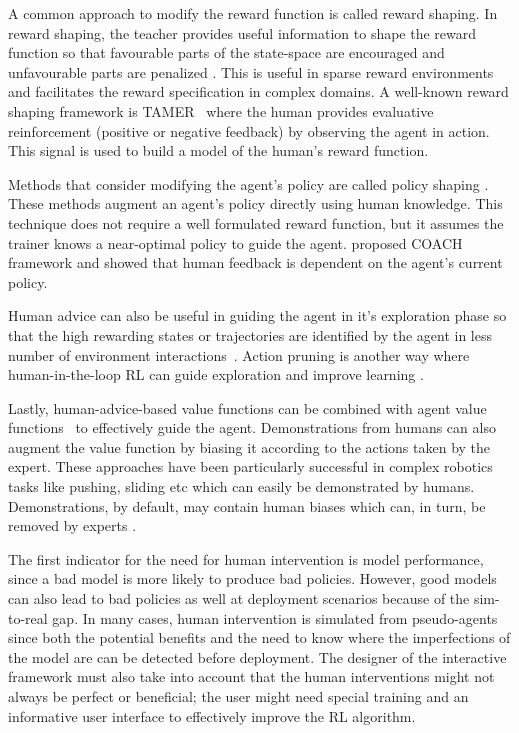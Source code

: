 \documentclass[twoside,11pt]{article}
\begin{document}
A common approach to modify the reward function is called reward shaping. In reward shaping, the teacher provides useful information to shape the reward function so that favourable parts of the state-space are encouraged and unfavourable parts are penalized \citep{ng:99}. This is useful in sparse reward environments and facilitates the reward specification in complex domains. A well-known reward shaping framework is TAMER~\citep{Knox:2008:TAMER, knox:13} where the human provides evaluative reinforcement (positive or negative feedback) by observing the agent in action. This signal is used to build a model of the human's reward function. 

Methods that consider modifying the agent's policy are called policy shaping \citep{cederborg2015policy,griffith2013policy,WuEtAl:2021:HITLDRLAutonomousDriving}. These methods augment an agent's policy directly using human knowledge. This technique does not require a well formulated reward function, but it assumes the trainer knows a near-optimal policy to guide the agent. \citet{macglashan2017interactive} proposed COACH framework and showed that human feedback is dependent on the agent’s current policy. 

Human advice can also be useful in guiding the agent in it’s exploration phase so that the high rewarding states or trajectories are identified by the agent in less number of environment interactions~\citep{amir2016interactive}. Action pruning is another way where human-in-the-loop RL can guide exploration and improve learning \citep{Abel:2017:AgentAgnosticHumanInTheLoopRL}.

Lastly, human-advice-based value functions can be combined with agent value functions~\citep{jiang:21,kartoun:10, taylor2011integrating, WuEtAl:2021:HITLDRLAutonomousDriving} to effectively guide the agent. Demonstrations \citep{hester2018deep,vecerik2017leveraging,nair2018overcoming} from humans can also augment the value function by biasing it according to the  actions taken by the expert. These approaches have been particularly successful in complex robotics tasks like pushing, sliding etc which can easily be demonstrated by humans.  Demonstrations, by default, may contain human biases which can, in turn, be removed by experts \citep{Wang:2022:SkillPreferences}.

The first indicator for the need for human intervention is model performance, since a bad model is more likely to produce bad policies. However, good models can also lead to bad policies as well at deployment scenarios because of the sim-to-real gap. In many cases, human intervention is simulated from pseudo-agents since both the potential benefits and the need to know where the imperfections of the model are can be detected before deployment. The designer of the interactive framework must also take into account that the human interventions might not always be perfect or beneficial; the user might need special training and an informative user interface to effectively improve the RL algorithm. 
\end{document}
